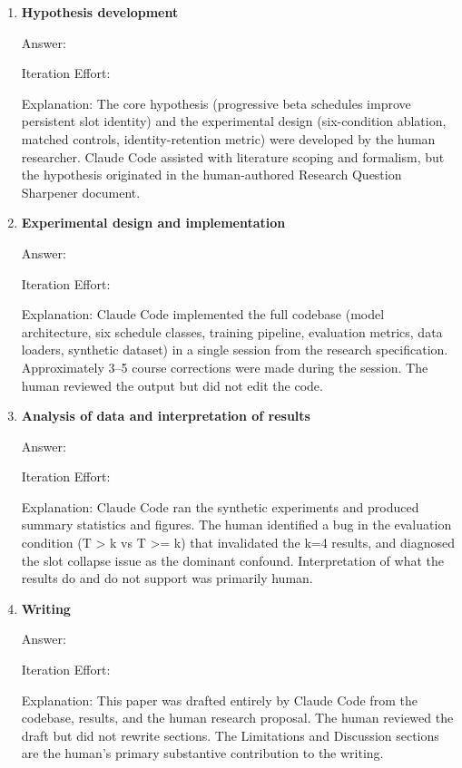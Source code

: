 \documentclass{article}
\begin{document}
\begin{enumerate}

    \item \textbf{Hypothesis development}

    Answer: \involvementB{}

    Iteration Effort: \iterationLow{}

    Explanation: The core hypothesis (progressive beta schedules improve persistent
    slot identity) and the experimental design (six-condition ablation, matched controls,
    identity-retention metric) were developed by the human researcher. Claude Code
    assisted with literature scoping and formalism, but the hypothesis originated
    in the human-authored Research Question Sharpener document.

    \item \textbf{Experimental design and implementation}

    Answer: \involvementD{}

    Iteration Effort: \iterationLow{}

    Explanation: Claude Code implemented the full codebase (model architecture,
    six schedule classes, training pipeline, evaluation metrics, data loaders,
    synthetic dataset) in a single session from the research specification.
    Approximately 3--5 course corrections were made during the session.
    The human reviewed the output but did not edit the code.

    \item \textbf{Analysis of data and interpretation of results}

    Answer: \involvementC{}

    Iteration Effort: \iterationLow{}

    Explanation: Claude Code ran the synthetic experiments and produced summary
    statistics and figures. The human identified a bug in the evaluation condition
    (T > k vs T >= k) that invalidated the k=4 results, and diagnosed the slot
    collapse issue as the dominant confound. Interpretation of what the results
    do and do not support was primarily human.

    \item \textbf{Writing}

    Answer: \involvementD{}

    Iteration Effort: \iterationLow{}

    Explanation: This paper was drafted entirely by Claude Code from the codebase,
    results, and the human research proposal. The human reviewed the draft but
    did not rewrite sections. The Limitations and Discussion sections are the
    human's primary substantive contribution to the writing.

\end{enumerate}
\end{document}
